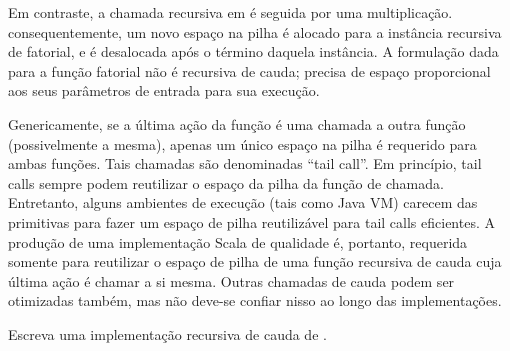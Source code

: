 Em contraste, a chamada recursiva em  \'{e} seguida por uma 
multiplica\c{c}\~{a}o. consequentemente, um novo espa\c{c}o na pilha \'{e} alocado para a 
inst\^{a}ncia recursiva de fatorial, e \'{e} desalocada ap\'{o}s o t\'{e}rmino daquela 
inst\^{a}ncia. A formula\c{c}\~{a}o dada para a fun\c{c}\~{a}o fatorial n\~{a}o \'{e} recursiva de cauda;
 precisa de espa\c{c}o proporcional aos seus par\^{a}metros de entrada para sua
execu\c{c}\~{a}o. 

Genericamente, se a \'{u}ltima a\c{c}\~{a}o da fun\c{c}\~{a}o \'{e} uma chamada a outra fun\c{c}\~{a}o
(possivelmente a mesma), apenas um \'{u}nico espa\c{c}o na pilha \'{e} requerido para 
ambas fun\c{c}\~{o}es. Tais chamadas s\~{a}o denominadas ``tail call''. Em 
princ\'{i}pio, tail calls sempre podem reutilizar o espa\c{c}o da pilha da fun\c{c}\~{a}o 
de chamada. Entretanto, alguns ambientes de execu\c{c}\~{a}o (tais como Java VM) 
carecem das primitivas para fazer um espa\c{c}o de pilha reutiliz\'{a}vel para 
tail calls eficientes. A produ\c{c}\~{a}o de uma implementa\c{c}\~{a}o Scala de qualidade \'{e},
portanto, requerida somente para reutilizar o espa\c{c}o de pilha de uma fun\c{c}\~{a}o 
recursiva de cauda cuja \'{u}ltima a\c{c}\~{a}o \'{e} chamar a si mesma. Outras chamadas de 
cauda podem ser otimizadas tamb\'{e}m, mas n\~{a}o deve-se confiar nisso ao longo das
implementa\c{c}\~{o}es. 

\begin{exercise} Escreva uma implementa\c{c}\~{a}o recursiva de cauda de 
.
\end{exercise}


